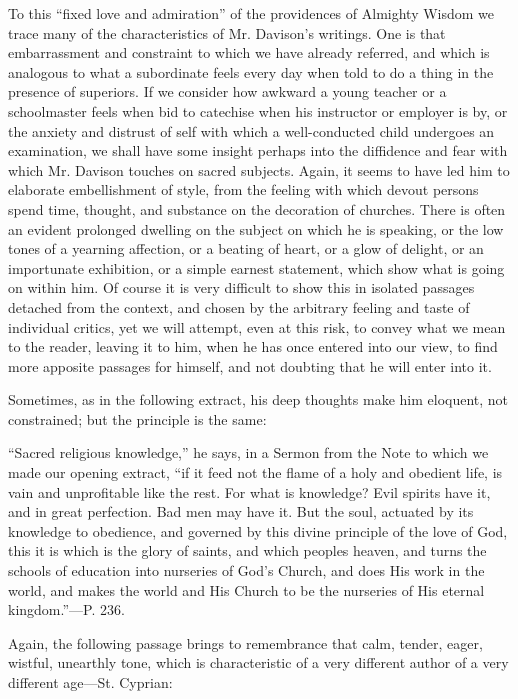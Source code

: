To this ``fixed love and admiration'' of the
providences of Almighty Wisdom we trace many of the characteristics of
Mr. Davison's writings. One is that embarrassment and constraint to
which we have already referred, and which is analogous to what a
subordinate feels every day when told to do a thing in the presence of
superiors. If we consider how awkward a young teacher or a
schoolmaster feels when bid to catechise when his instructor or
employer is by, or the anxiety and distrust of self with which a
well-conducted child undergoes an examination, we shall have some
insight perhaps into the diffidence and fear with which Mr. Davison
touches on sacred subjects. Again, it seems to have led him to
elaborate embellishment of style, from the feeling with which devout
persons spend time, thought, and substance on the decoration of
churches. There is often an evident prolonged dwelling on the subject on which he is speaking, or the low tones of a yearning
affection, or a beating of heart, or a glow of delight, or an
importunate exhibition, or a simple earnest statement, which show what
is going on within him. Of course it is very difficult to show this in
isolated passages detached from the context, and chosen by the
arbitrary feeling and taste of individual critics, yet we will
attempt, even at this risk, to convey what we mean to the reader,
leaving it to him, when he has once entered into our view, to find
more apposite passages for himself, and not doubting that he will
enter into it.

Sometimes, as in the following extract, his deep
thoughts make him eloquent, not constrained; but the principle is the
same:

``Sacred
religious knowledge,'' he says, in a Sermon from the Note to which we
made our opening extract, ``if it feed not the flame of a holy and
obedient life, is vain and unprofitable like the rest. For what is
knowledge? Evil spirits have it, and in great perfection. Bad men may
have it. But the soul, actuated by its knowledge to obedience, and
governed by this divine principle of the love of God, this it is which
is the glory of saints, and which peoples heaven, and turns the
schools of education into nurseries of God's Church, and does His work
in the world, and makes the world and His Church to be the nurseries
of His eternal kingdom.''—P. 236.

Again, the following passage brings to
remembrance that calm, tender, eager, wistful, unearthly tone, which
is characteristic of a very different author of a very different
age—St. Cyprian:

